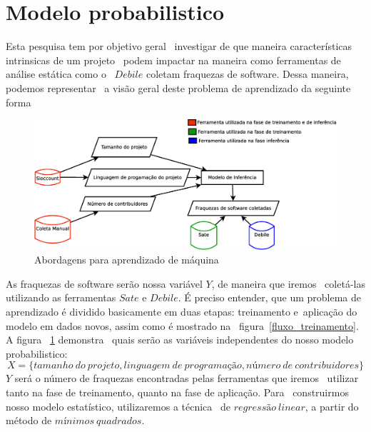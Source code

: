 \section{Modelo probabilistico}
 Esta pesquisa tem por objetivo geral \
investigar de que maneira características intrinsicas de um projeto \
podem impactar na maneira como ferramentas de análise estática como o \ 
$Debile$ coletam fraquezas de software. Dessa maneira, podemos representar \
a visão geral deste problema de aprendizado da seguinte forma

\begin{figure}[h]
	\centering
	\label{visao_geral}
        \includegraphics[scale=0.40]{figuras/visao_geral.eps}
	\caption{Abordagens para aprendizado de máquina}
\end{figure}

As fraquezas de software serão nossa variável $Y$, de maneira que iremos \
coletá-las utilizando as ferramentas $Sate$ e $Debile$. É preciso entender,
que um problema de aprendizado é dividido basicamente em duas etapas: treinamento e\ 
aplicação do modelo em dados novos, assim como é mostrado na \ 
figura~\ref{fluxo_treinamento}.  A figura ~\ref{visao_geral} demonstra \
quais serão as variáveis independentes do nosso modelo probabilistico: \
\[
X = \{tamanho\ do\ projeto, linguagem\ de\ programação, número\ de\ contribuidores\}
\]
$Y$ será o número de fraquezas encontradas pelas ferramentas que iremos \ 
utilizar tanto na fase de treinamento, quanto na fase de aplicação.  Para \ 
construirmos nosso modelo estatístico, utilizaremos a técnica \ 
de $regressão\ linear$, a partir do método de $mínimos\ quadrados$.


